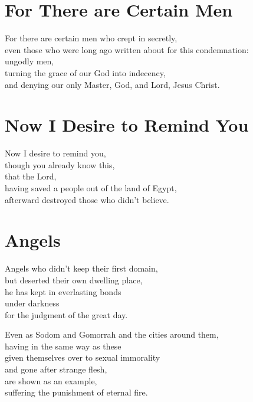 \documentclass[twoside, openany, 12pt]{extbook}
\newcommand{\tab}[1][0.5cm]{\hspace*{#1}}
\begin{document}
\newpage\section{For There are Certain Men}

For there are certain men who crept in secretly,
\\
even those who were long ago written about for this condemnation:
\\
\tab{}
ungodly men,
\\
\tab{}
\tab{}
turning the grace of our God into indecency,
\\
\tab{}
\tab{}
and denying our only Master,
God,
and Lord,
Jesus Christ.

\newpage\section{Now I Desire to Remind You}

Now I desire to remind you,
\\
\tab{}
though you already know this,
\\
that the Lord,
\\
\tab{}
having saved a people out of the land of Egypt,
\\
\tab{}
afterward destroyed those who didn’t believe.

\newpage\section{Angels}

Angels who didn’t keep their first domain,
\\
but deserted their own dwelling place,
\\
he has kept in everlasting bonds
\\
\tab{}
under darkness
\\
\tab{}
\tab{}
for the judgment of the great day.


Even as Sodom and Gomorrah and the cities around them,
\\
having in the same way as these
\\
\tab{}
given themselves over to sexual immorality
\\
\tab{}
and gone after strange flesh,
\\
are shown as an example,
\\
\tab{}
suffering the punishment of eternal fire.
\end{document}
